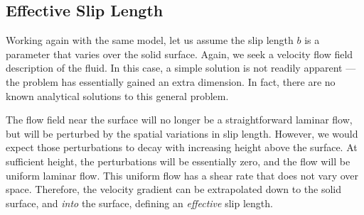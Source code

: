\documentclass[a4paper]{report}
\begin{document}
\subsection*{Effective Slip Length}

Working again with the same model, let us assume the slip length $b$ is a parameter that varies over the solid surface. Again, we seek a velocity flow field description of the fluid. In this case, a simple solution is not readily apparent --- the problem has essentially gained an extra dimension. In fact, there are no known analytical solutions to this general problem.

The flow field near the surface will no longer be a straightforward laminar flow, but will be perturbed by the spatial variations in slip length. However, we would expect those perturbations to decay with increasing height above the surface. At sufficient height, the perturbations will be essentially zero, and the flow will be uniform laminar flow. This uniform flow has a shear rate that does not vary over space.  Therefore, the velocity gradient can be extrapolated down to the solid surface, and \emph{into} the surface, defining an \emph{effective} slip length.

\vspace{1em}

\begin{center}
\end{center}
\end{document}
